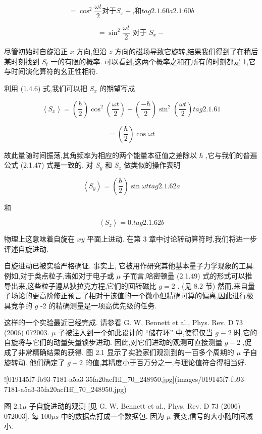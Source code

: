 \documentclass[lang=cn,newtx,10pt,scheme=chinese,thmcnt=section]{elegantbook}
\begin{document}
$$
= {\cos }^{2}\frac{\omega t}{2}\text{对于}{S}_{x} + \text{,和} tag{2.1.60a 2.1.60b}
$$

$$
= {\sin }^{2}\frac{\omega t}{2}\text{ 对于 }{S}_{x} -
$$

尽管初始时自旋沿正 $x$ 方向,但沿 $z$ 方向的磁场导致它旋转,结果我们得到了在稍后某时刻找到 ${S}_{t}$ 一的有限的概率. 可以看到,这两个概率之和在所有的时刻都是 1,它与时间演化算符的幺正性相符.

利用 (1.4.6) 式,我们可以把 ${S}_{x}$ 的期望写成

$$
\left\langle {S}_{x}\right\rangle = \left( \frac{\hbar }{2}\right) {\cos }^{2}\left( \frac{\omega t}{2}\right) + \left( \frac{-\hbar }{2}\right) {\sin }^{2}\left( \frac{\omega t}{2}\right) tag{2.1.61}
$$

$$
= \left( \frac{\hbar }{2}\right) \cos {\omega t}
$$

故此量随时间振荡,其角频率为相应的两个能量本征值之差除以 $\hbar$ ,它与我们的普遍公式 (2.1.47) 式是一致的. 对 ${S}_{y}$ 和 ${S}_{z}$ 做类似的操作表明

$$
\left\langle {S}_{y}\right\rangle = \left( \frac{\hbar }{2}\right) \sin {\omega t} tag{2.1.62a}
$$

和

$$
\left\langle {S}_{z}\right\rangle = 0. tag{2.1.62b}
$$

物理上这意味着自旋在 ${xy}$ 平面上进动. 在第 3 章中讨论转动算符时,我们将进一步评述自旋进动.

自旋进动已被实验严格确证. 事实上, 它被用作研究其他基本量子力学现象的工具. 例如,对于类点粒子,诸如对于电子或 $\mu$ 子而言,哈密顿量 (2.1.49) 式的形式可以推导出来,这些粒子遵从狄拉克方程,它们的回转磁比 $g = 2$ . (见 8.2 节) 然而,来自量子场论的更高阶修正预言了相对于该值的一个微小但精确可算的偏离,因此进行极具竞争的 $g$ -2 的精确测量是一项高优先级的任务.

这样的一个实验最近已经完成. 请参看 G. W. Bennett et al., Phys. Rev. D 73 (2006) 072003. $\mu$ 子被注入到一个如此设计的 “储存环” 中,使得仅当 $g \equiv 2$ 时,它的自旋将与它们的动量矢量锁步进动. 因此,对它们进动的观测可直接测量 $g - 2$ ,促成了非常精确结果的获得. 图 2.1 显示了实验家们观测到的一百多个周期的 $\mu$ 子自旋转动. 他们确定了 $g - 2$ 的值,其精度小于百万分之一,与理论值符合得相当好.

![019145f7-fb93-7181-a5a3-35fa20acf1ff_70_248950.jpg](images/019145f7-fb93-7181-a5a3-35fa20acf1ff_70_248950.jpg)

图 ${2.1\mu }$ 子自旋进动的观测 [见 G. W. Bennett et al., Phys. Rev. D 73 (2006) 072003]. 每 ${100\mu }\mathrm{s}$ 中的数据点打成一个数据包. 因为 $\mu$ 衰变,信号的大小随时间减小.
\end{document}

